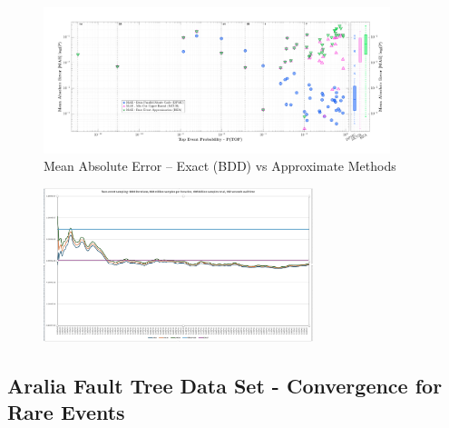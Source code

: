 \begin{frame}[allowframebreaks]
    \begin{figure}[h]
    \centering
    \includegraphics[width=0.9\textwidth]{4_casestudy/error_vs_prob_detailed.png}
    \caption{Mean Absolute Error – Exact (BDD) vs Approximate Methods}
    \label{fig:mae_vs_logp}
\end{figure}
\end{frame}

\begin{frame}[allowframebreaks]
    \begin{figure}[h]
    \centering
    \includegraphics[width=0.7\textwidth]{4_casestudy/rare-event.jpg}
    \label{fig:rare}
\end{figure}
\end{frame}


\subsection{Aralia Fault Tree Data Set - Convergence for Rare Events}
\begin{frame}[allowframebreaks]
    
\end{frame}



